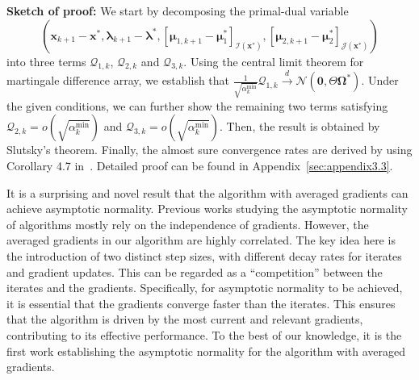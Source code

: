 \documentclass[aos]{imsart}
\numberwithin{equation}{section}
\theoremstyle{plain}
\newcommand{\michael}[1]{\textcolor{red}{Michael:\ #1}}
\newcommand{\yihang}[1]{\textcolor{blue}{Yihang:\ #1}}
\begin{document}
\textbf{Sketch of proof:} 
We start by decomposing the primal-dual variable 
$$(\bm{x}_{k+1} - \bm{x}^{*}, \bm{\lambda}_{k+1} - \bm{\lambda}^{*}, \left[ \bm{\mu}_{1,k+1} - \bm{\mu}_{1}^{*}\right]_{\mathcal{I}(\bm{x}^{*})}, \left[ \bm{\mu}_{2,k+1} - \bm{\mu}_{2}^{*} \right]_{\mathcal{J}(\bm{x}^{*})})$$ 
into three terms $\mathcal{Q}_{1,k}$, $\mathcal{Q}_{2,k}$ and $\mathcal{Q}_{3,k}$. 
Using the central limit theorem for martingale difference array, we establish that $\frac{1}{\sqrt{\alpha_k^{\text{min}}}} \mathcal{Q}_{1,k} \stackrel{d}{\longrightarrow} \mathcal{N} \left( \bm{0}, \Theta \bm{\Omega}^{*} \right)$. 
Under the given conditions, we can further show the remaining two terms satisfying $\mathcal{Q}_{2,k} = o\left( \sqrt{\alpha_k^{\text{min}}}\right)$ and $\mathcal{Q}_{3,k} = o\left( \sqrt{\alpha_k^{\text{min}}}\right)$. 
Then, the result is obtained by Slutsky's theorem. 
Finally, the almost sure convergence rates are derived by using Corollary 4.7 in~\cite{hao2014convergence}. Detailed proof can be found in Appendix~\ref{sec:appendix3.3}.


It is a surprising and novel result that the algorithm with averaged gradients can achieve asymptotic normality. 
Previous works \cite{na2022asymptotic, chen2020statistical, leluc2020asymptotic, toulis2017asymptotic} studying the asymptotic normality of algorithms mostly rely on the independence of gradients.
However, the averaged gradients in our algorithm are highly correlated. 
The key idea here is the introduction of two distinct step sizes, with different decay rates for iterates and gradient updates. 
This can be regarded as a ``competition'' between the iterates and the gradients. 
Specifically, for asymptotic normality to be achieved, it is essential that the gradients converge faster than the iterates. 
This ensures that the algorithm is driven by the most current and relevant gradients, contributing to its effective performance.
To the best of our knowledge, it is the first work establishing the asymptotic normality for the algorithm with averaged gradients. 

    
\end{document}
